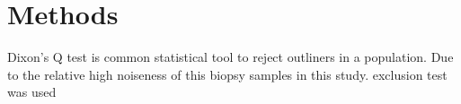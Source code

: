 \chapter{Methods}

Dixon's Q test is common statistical tool to reject outliners in a population. Due to the relative high noiseness of this biopsy samples in this study.   exclusion test was used 